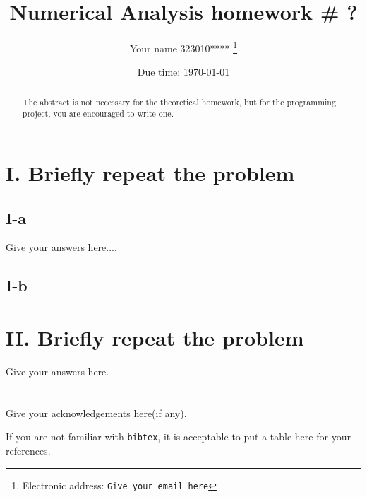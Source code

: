 \documentclass[a4paper]{article}
\begin{document}
\title{Numerical Analysis homework \# ?}

\author{Your name 323010****
  \thanks{Electronic address: \texttt{Give your email here}}}


\date{Due time: \today}

\maketitle

\begin{abstract}
    The abstract is not necessary for the theoretical homework, 
    but for the programming project, 
    you are encouraged to write one.      
\end{abstract}





\section*{I. Briefly repeat the problem}

\subsection*{I-a}

Give your answers here....\cite{Zhang2020BooleanAO}

\subsection*{I-b}

\section*{II. Briefly repeat the problem}

Give your answers here.





\section*{  }
Give your acknowledgements here(if any).


\printbibliography

If you are not familiar with \texttt{bibtex}, 
it is acceptable to put a table here for your references.
\end{document}
